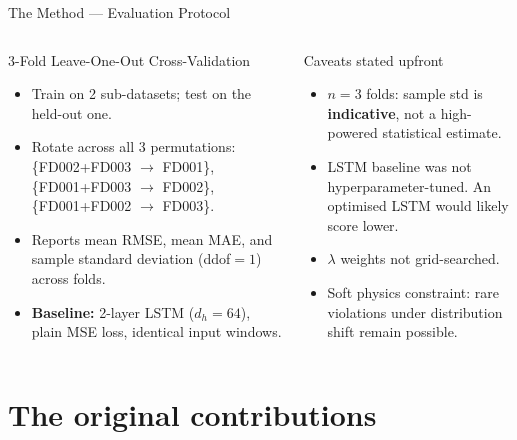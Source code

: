 \documentclass[10pt, aspectratio=169, handout]{beamer}
\begin{document}
\begin{frame}{The Method --- Evaluation Protocol}
  \begin{columns}[T]
      \begin{block}{3-Fold Leave-One-Out Cross-Validation}
        \small
        \begin{itemize}
          \setlength\itemsep{4pt}
          \item Train on 2 sub-datasets; test on the held-out one.
          \item Rotate across all 3 permutations:
                \{FD002+FD003 $\to$ FD001\},
                \{FD001+FD003 $\to$ FD002\},
                \{FD001+FD002 $\to$ FD003\}.
          \item Reports mean RMSE, mean MAE, and sample standard
                deviation (ddof$=1$) across folds.
          \item \textbf{Baseline:} 2-layer LSTM ($d_h\!=\!64$), plain MSE loss,
                identical input windows.
        \end{itemize}
      \end{block}

      \begin{alertblock}{Caveats stated upfront}
        \small
        \begin{itemize}
          \setlength\itemsep{4pt}
          \item $n\!=\!3$ folds: sample std is \textbf{indicative}, not a
                high-powered statistical estimate.
          \item LSTM baseline was not hyperparameter-tuned.
                An optimised LSTM would likely score lower.
          \item $\lambda$ weights not grid-searched.
          \item Soft physics constraint: rare violations under
                distribution shift remain possible.
        \end{itemize}
      \end{alertblock}
  \end{columns}
\end{frame}

\section{The original contributions}
\end{document}
